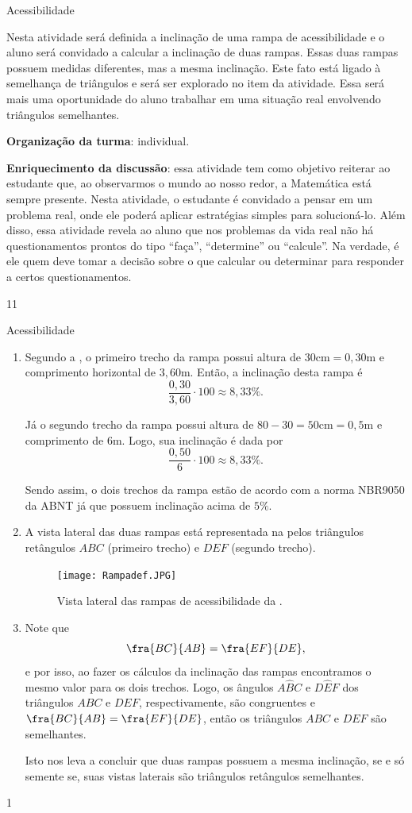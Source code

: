 \clearmargin
\begin{sugestions}{Acessibilidade}
{
Nesta atividade será definida a inclinação de uma rampa de acessibilidade e o aluno será convidado a calcular a inclinação de duas rampas. Essas duas rampas possuem medidas diferentes, mas a mesma inclinação. Este fato está ligado à semelhança de triângulos e será ser explorado no item  da atividade. Essa será mais uma oportunidade do aluno trabalhar em uma situação real envolvendo triângulos semelhantes.

\textbf{Organização da turma}: individual.

\textbf{Enriquecimento da discussão}: essa atividade tem como objetivo reiterar ao estudante que, ao observarmos o mundo ao nosso redor, a Matemática está sempre presente. Nesta atividade, o estudante é convidado a pensar em um problema real, onde ele poderá aplicar estratégias simples para solucioná-lo. Além disso, essa atividade revela ao aluno que nos problemas da vida real não há questionamentos prontos do tipo ``faça'', ``determine'' ou ``calcule''. Na verdade, é ele quem deve tomar a decisão sobre o que calcular ou determinar para responder a certos questionamentos.
}{1}{1}
\end{sugestions}
\clearmargin
\begin{answer}{Acessibilidade}
{
\begin{enumerate}

\item{}
Segundo a , o primeiro trecho da rampa possui altura de $30\text{cm}=0,30$m e comprimento horizontal de $3,60$m. Então, a inclinação desta rampa é 
$$\frac{0,30}{3,60}\cdot 100\approx 8,33\%.$$

Já o segundo trecho da rampa possui altura de $80-30=50\text{cm}=0,5$m e comprimento de $6$m. Logo, sua inclinação é dada por 
$$\frac{0,50}{6}\cdot 100\approx 8,33\%.$$

Sendo assim, o dois trechos da rampa estão de acordo com a norma NBR9050 da ABNT já que possuem inclinação acima de $5\%$.

\item{}
A vista lateral das duas rampas está representada na   pelos triângulos retângulos $ABC$ (primeiro trecho) e $DEF$ (segundo trecho).
\begin{figure}[H]
    \centering
    \texttt{[image: Rampadef.JPG]}
    \caption{Vista lateral das rampas de acessibilidade da  .}
    \label{Rampadef}
\end{figure}

\item{}
Note que 
$$\fra{BC}{AB}=\fra{EF}{DE},$$
e por isso, ao fazer os cálculos da inclinação das rampas encontramos o mesmo valor para os dois trechos. 
Logo, os ângulos $A\hat{B}C$ e $D\hat{E}F$ dos triângulos $ABC$ e $DEF$, respectivamente, são congruentes e $\fra{BC}{AB}=\fra{EF}{DE}$, então os triângulos $ABC$ e $DEF$ são semelhantes.

Isto nos leva a concluir que duas rampas possuem a mesma inclinação, se e só semente se, suas vistas laterais são triângulos retângulos semelhantes. 
\end{enumerate}
}{1}
\end{answer}

